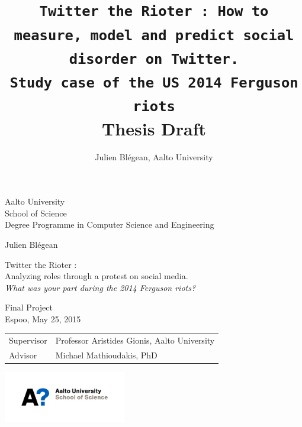 \documentclass[a4paper,twoside,12pt,openright]{report}
\title{\texttt{Twitter the Rioter : How to measure, model and predict social disorder on Twitter. \\Study case of the US 2014 Ferguson riots}\\ \textbf{\Large Thesis Draft}}
\author{Julien Blégean, Aalto University}
\begin{document}
\raggedbottom
\thispagestyle{empty}
\noindent Aalto University\\[5pt]
School of Science\\[5pt]
Degree Programme in Computer Science and Engineering

\vspace{4cm}

\noindent Julien Blégean\\[20pt]
\begin{minipage}[l]{0.8\textwidth}
    {\Large {\textsf{Twitter the Rioter :\\[20pt] Analyzing roles through a protest on social media.\\[20pt] \emph{\large What was your part during the 2014 Ferguson riots?}}}}\\
\end{minipage}

\vspace{1cm}

\vfill
\noindent Final Project\\[5pt]
Espoo, May 25, 2015\\[15pt]

\noindent
\begin{tabular}{@{}ll}
Supervisor & Professor Aristides Gionis, Aalto University \\[5pt]
Advisor & Michael Mathioudakis, PhD\\
\end{tabular}

\newpage
\thispagestyle{empty}
\mbox{}
\newpage

\begin{minipage}[t]{\textwidth}
  \flushright
  \includegraphics [width=0.4\textwidth]{images/aalto_logo_b.png}
\end{minipage}
\end{document}
